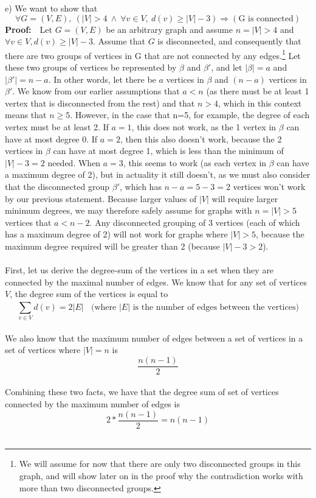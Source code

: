\documentclass{article}
\begin{document}
\begin{enumerate}
	e) We want to show that $$\forall G=(V,E),\ (|V|>4\ \wedge\ \forall v \in V,\ d(v) \geq |V|-3) \Rightarrow (\text{G is connected})$$ 
	\textbf{Proof:}\ \ Let $G=(V,E)$ be an arbitrary graph and assume $n=|V|>4$ and $\forall v \in V, d(v) \geq |V|-3$. Assume that $G$ is disconnected, and consequently that there are two groups of vertices in G that are not connected by any edges.\footnote{We will assume for now that there are only two disconnected groups in this graph, and will show later on in the proof why the contradiction works with more than two disconnected groups.} Let these two groups of vertices be represented by $\beta$ and $\beta'$, and let $|\beta|=a$ and $|\beta'|=n-a$. In other words, let there be $a$ vertices in $\beta$ and $(n-a)$ vertices in $\beta'$. We know from our earlier assumptions that $a<n$ (as there must be at least 1 vertex that is disconnected from the rest) and that $n>4$, which in this context means that $n\geq 5$. However, in the case that n=5, for example, the degree of each vertex must be at least 2. If $a=1$, this does not work, as the 1 vertex in $\beta$ can have at most degree 0. If $a=2$, then this also doesn't work, because the 2 vertices in $\beta$ can have at most degree 1, which is less than the minimum of $|V|-3=2$ needed. When $a=3$, this seems to work (as each vertex in $\beta$ can have a maximum degree of 2), but in actuality it still doesn't, as we must also consider that the disconnected group $\beta'$, which has $n-a=5-3=2$ vertices won't work by our previous statement. Because larger values of $|V|$ will require larger minimum degrees, we may therefore safely assume for graphs with $n=|V|>5$ vertices that $a<n-2$. Any disconnected grouping of 3 vertices (each of which has a maximum degree of 2) will not work for graphs where $|V|>5$, because the maximum degree required will be greater than 2 (because $|V|-3>2$). \\\\
	First, let us derive the degree-sum of the vertices in a set when they are connected by the maximal number of edges. We know that for any set of vertices $V$, the degree sum of the vertices is equal to $$\sum_{v \in V}^{}d(v)=2|E|\ \ \ \ \textrm{(where $|E|$ is the number of edges between the vertices)}$$\\
	We also know that the maximum number of edges between a set of vertices in a set of vertices where $|V|=n$ is $$\frac{n(n-1)}{2}$$ \\
	Combining these two facts, we have that the degree sum of set of vertices connected by the maximum number of edges is $$2 * \frac{n(n-1)}{2} = n(n-1)$$ \\

\end{enumerate}
\end{document}
